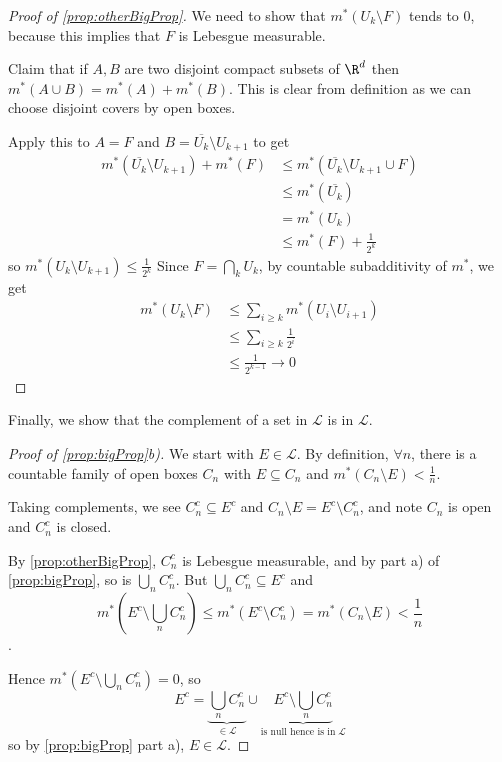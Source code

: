 \documentclass{article}
\newcommand{\1}[1]{\mathbbm{1}_{#1}}
\begin{document}
\begin{proof}[Proof of \cref{prop:otherBigProp}]
    We need to show that $m^*(U_k \setminus F)$ tends to $0$, because this implies that $F$ is Lebesgue measurable.

    Claim that if $A, B$ are two disjoint compact subsets of $\R^d$ then $m^*(A \cup B) = m^*(A) + m^*(B)$. This is clear from definition as we can choose disjoint covers by open boxes.

    Apply this to $A = F$ and $B = \overline{U_k} \setminus U_{k+1}$ to get
    \begin{align*}
        m^*(\overline{U_k} \setminus U_{k+1}) + m^*(F) &\leq m^*(\overline{U_k} \setminus U_{k+1} \cup F) \\
                                                       &\leq m^*(\overline{U_k}) \\
                                                       &= m^*(U_k) \\
                                                       &\leq m^*(F) + \frac1{2^k}
    \end{align*}
    so $m^*(U_k \setminus U_{k+1}) \leq \frac1{2^k}$
    Since $F = \bigcap_k U_k$, by countable subadditivity of $m^*$, we get
    \begin{align*}
        m^*(U_k \setminus F) &\leq \sum_{i \geq k} m^* (U_i \setminus U_{i+1}) \\
                             &\leq \sum_{i \geq k} \frac{1}{2^i} \\
                             &\leq \frac{1}{2^{k-1}} \to 0
    \end{align*}
\end{proof}

Finally, we show that the complement of a set in $\mathcal{L}$ is in $\mathcal{L}$.

\begin{proof}[Proof of \cref{prop:bigProp}b)]
    We start with $E \in \mathcal{L}$.  By definition, $\forall n$, there is a countable family of open boxes $C_n$ with $E \subseteq C_n$ and $m^* (C_n \setminus E) < \frac1n$.

    Taking complements, we see $C_n^c \subseteq E^c$ and $C_n \setminus E = E^c \setminus C_n^c$, and note $C_n$ is open and $C_n^c$ is closed.

    By \cref{prop:otherBigProp}, $C_n^c$ is Lebesgue measurable, and by part a) of \cref{prop:bigProp}, so is $\bigcup_n C_n^c$. But $\bigcup_n C_n^c \subseteq E^c$ and \begin{equation*}m^*\left(E^c \setminus \bigcup_n C_n^c\right) \leq m^*(E^c \setminus C_n^c) = m^* (C_n \setminus E) < \frac1n\end{equation*}.

    Hence $m^* (E^c \setminus \bigcup_n C_n^c) = 0$, so
    \begin{equation*}
        E^c = \underbrace{\bigcup_n C_n^c}_{\in \mathcal{L}} \cup \underbrace{E^c \setminus \bigcup_n C_n^c}_{\text{is null hence is in} \; \mathcal{L}}
    \end{equation*}
    so by \cref{prop:bigProp} part a), $E \in \mathcal{L}$.
\end{proof}
\end{document}
